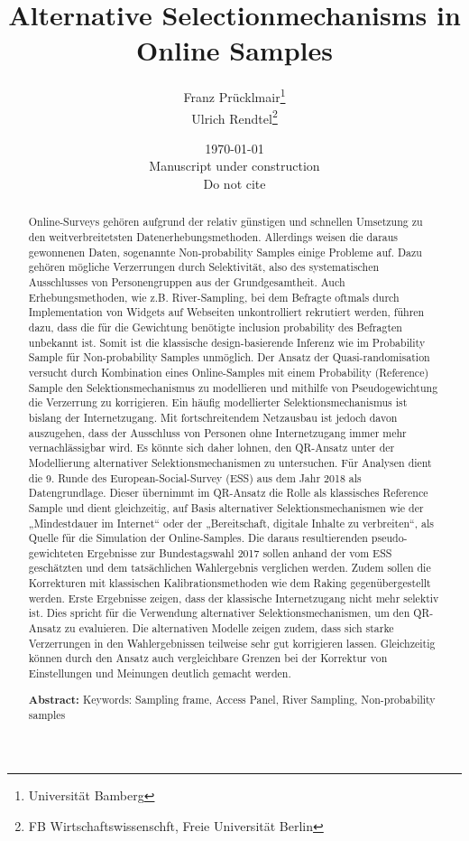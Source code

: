 \documentclass[a4paper , 11pt]{article}
\title{Alternative Selectionmechanisms in Online Samples}
\author  {Franz Prücklmair\thanks{Universität Bamberg} \\ Ulrich Rendtel\thanks{FB Wirtschaftswissenschft, Freie Universität Berlin} 
        }
\date{ \today\\Manuscript under construction\\ Do not cite}
\begin{document}
\maketitle
\tableofcontents

\begin{abstract}

Online-Surveys gehören aufgrund der relativ günstigen und schnellen Umsetzung zu den weitverbreitetsten Datenerhebungsmethoden. Allerdings weisen die daraus gewonnenen Daten, sogenannte Non-probability Samples einige Probleme auf. Dazu gehören mögliche Verzerrungen durch Selektivität, also des systematischen Ausschlusses von Personengruppen aus der Grundgesamtheit. Auch Erhebungsmethoden, wie z.B. River-Sampling, bei dem Befragte oftmals durch Implementation von Widgets auf Webseiten unkontrolliert rekrutiert werden, führen dazu, dass die für die Gewichtung benötigte inclusion probability des Befragten unbekannt ist. Somit ist die klassische design-basierende Inferenz wie im Probability Sample für Non-probability Samples unmöglich.
Der Ansatz der Quasi-randomisation versucht durch Kombination eines Online-Samples mit einem Probability (Reference) Sample den Selektionsmechanismus zu modellieren und mithilfe von Pseudogewichtung die Verzerrung zu korrigieren. Ein häufig modellierter Selektionsmechanismus ist bislang der Internetzugang. Mit fortschreitendem Netzausbau ist jedoch davon auszugehen, dass der Ausschluss von Personen ohne Internetzugang immer mehr vernachlässigbar wird. Es könnte sich daher lohnen, den QR-Ansatz unter der Modellierung alternativer Selektionsmechanismen zu untersuchen.
Für Analysen dient die 9. Runde des European-Social-Survey (ESS) aus dem Jahr 2018 als Datengrundlage. Dieser übernimmt im QR-Ansatz die Rolle als klassisches Reference Sample und dient gleichzeitig, auf Basis alternativer Selektionsmechanismen wie der „Mindestdauer im Internet“ oder der „Bereitschaft, digitale Inhalte zu verbreiten“, als Quelle für die Simulation der Online-Samples. Die daraus resultierenden pseudo-gewichteten Ergebnisse zur Bundestagswahl 2017 sollen anhand der vom ESS geschätzten und dem tatsächlichen Wahlergebnis verglichen werden. Zudem sollen die Korrekturen mit klassischen Kalibrationsmethoden wie dem Raking gegenübergestellt werden.
Erste Ergebnisse zeigen, dass der klassische Internetzugang nicht mehr selektiv ist. Dies spricht für die Verwendung alternativer Selektionsmechanismen, um den QR-Ansatz zu evaluieren. Die alternativen Modelle zeigen zudem, dass sich starke Verzerrungen in den Wahlergebnissen teilweise sehr gut korrigieren lassen. Gleichzeitig können durch den Ansatz auch vergleichbare Grenzen bei der Korrektur von Einstellungen und Meinungen deutlich gemacht werden. 

\begin{center}
  \textbf{Abstract:} Keywords: Sampling frame, Access Panel, River Sampling, Non-probability samples
\end{center}



\end{abstract}
\newpage
\end{document}
